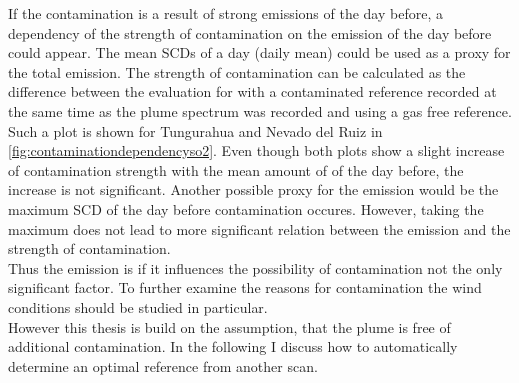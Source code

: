 If the contamination is a result of strong emissions of the day before, a dependency of the strength of contamination on the emission of the day before could appear. 
The mean  SCDs of a day (daily mean) could be used as a proxy for the total emission. The strength of contamination can be calculated as the difference between the evaluation for  with a contaminated reference recorded at the same time as the plume spectrum was recorded and using a gas free reference. Such a plot is shown for Tungurahua and Nevado del Ruiz in \cref{fig:contaminationdependencyso2}. Even though both plots show a slight increase of contamination strength with the mean amount of  of the day before, the increase is not significant. Another possible proxy for the  emission would be the maximum  SCD of the day before contamination occures. However, taking the maximum does not lead to more significant relation between the emission and the strength of contamination. \\
Thus the  emission is if it influences the possibility of contamination not the only significant factor. To further examine the reasons for contamination the wind conditions should be studied in particular. 
\\
However this thesis is build on the assumption, that the plume is free of additional contamination. %
In the following I discuss how to automatically determine an optimal reference from another scan.

